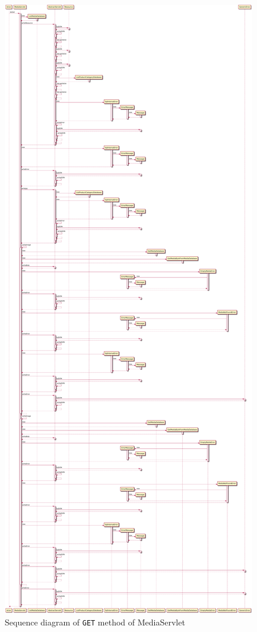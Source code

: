 \begin{figure}[H]
    \centering
    \includegraphics[width=\textwidth,height=0.95\textheight,keepaspectratio]{Schemas/MediaServlet_doGet.svg.pdf}
    \caption{Sequence diagram of \texttt{GET} method of MediaServlet}
    \label{fig:MediaServlet_doGet}
\end{figure}
